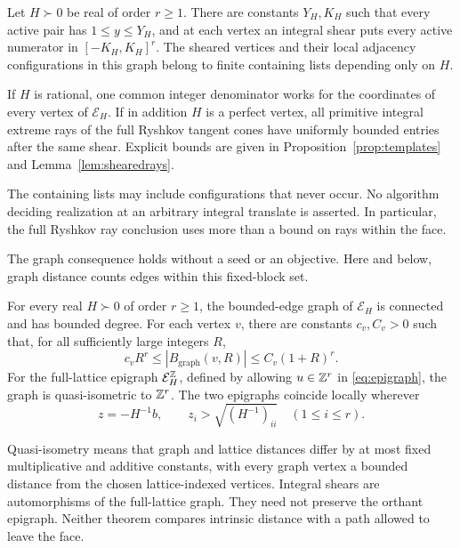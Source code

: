 \begin{theorem}\label{thm:finite}
Let $H\succ0$ be real of order $r\ge1$. There are constants $Y_H,K_H$ such that every active pair has $1\le y\le Y_H$, and at each vertex an integral shear puts every active numerator in $[-K_H,K_H]^r$. The sheared vertices and their local adjacency configurations in this graph belong to finite containing lists depending only on $H$.

If $H$ is rational, one common integer denominator works for the coordinates of every vertex of $\mathcal E_H$. If in addition $H$ is a perfect vertex, all primitive integral extreme rays of the full Ryshkov tangent cones have uniformly bounded entries after the same shear. Explicit bounds are given in Proposition~\ref{prop:templates} and Lemma~\ref{lem:shearedrays}.
\end{theorem}

The containing lists may include configurations that never occur. No algorithm deciding realization at an arbitrary integral translate is asserted. In particular, the full Ryshkov ray conclusion uses more than a bound on rays within the face.

The graph consequence holds without a seed or an objective. Here and below, graph distance counts edges within this fixed-block set.

\begin{theorem}\label{thm:growth}
For every real $H\succ0$ of order $r\ge1$, the bounded-edge graph of $\mathcal E_H$ is connected and has bounded degree. For each vertex $v$, there are constants $c_v,C_v>0$ such that, for all sufficiently large integers $R$,
\begin{equation}\label{eq:growth}
 c_vR^r\le |B_{\mathrm{graph}}(v,R)|\le C_v(1+R)^r.
\end{equation}
For the full-lattice epigraph $\mathcal E_H^{\mathbb Z}$, defined by allowing $u\in\mathbb Z^r$ in \eqref{eq:epigraph}, the graph is quasi-isometric to $\mathbb Z^r$. The two epigraphs coincide locally wherever
\begin{equation}\label{eq:deep}
 z=-H^{-1}b,\qquad z_i>\sqrt{(H^{-1})_{ii}}\quad(1\le i\le r).
\end{equation}
\end{theorem}

Quasi-isometry means that graph and lattice distances differ by at most fixed multiplicative and additive constants, with every graph vertex a bounded distance from the chosen lattice-indexed vertices. Integral shears are automorphisms of the full-lattice graph. They need not preserve the orthant epigraph. Neither theorem compares intrinsic distance with a path allowed to leave the face.

